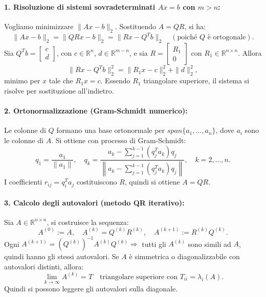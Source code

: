 \documentclass[12pt,a4paper]{article}
\begin{document}
\paragraph{1. Risoluzione di sistemi sovradeterminati \( Ax = b \) con \( m > n \):}

Vogliamo minimizzare \( \|Ax - b\|_2 \). Sostituendo \( A = QR \), si ha:
\[
\|Ax - b\|_2 = \|QRx - b\|_2 = \|Rx - Q^T b\|_2 \quad (\text{poiché } Q \text{ è ortogonale}).
\]
Sia \( Q^T b = \begin{bmatrix} c \\ d \end{bmatrix} \), con \( c \in \mathbb{R}^n \), \( d \in \mathbb{R}^{m-n} \), e sia \( R = \begin{bmatrix} R_1 \\ 0 \end{bmatrix} \) con \( R_1 \in \mathbb{R}^{n \times n} \). Allora
\[
\|Rx - Q^T b\|_2^2 = \|R_1 x - c\|_2^2 + \|d\|_2^2,
\]
minimo per \( x \) tale che \( R_1 x = c \). Essendo \( R_1 \) triangolare superiore, il sistema si risolve per sostituzione all'indietro.

\paragraph{2. Ortonormalizzazione (Gram-Schmidt numerico):}

Le colonne di \( Q \) formano una base ortonormale per \( span\{a_1, \dots, a_n\} \), dove \( a_i \) sono le colonne di \( A \). Si ottiene con processo di Gram-Schmidt:
\[
q_1 = \frac{a_1}{\|a_1\|},\quad
q_k = \frac{a_k - \sum_{j=1}^{k-1} (q_j^T a_k) q_j}{\left\| a_k - \sum_{j=1}^{k-1} (q_j^T a_k) q_j \right\|},\quad k = 2, \dots, n.
\]
I coefficienti \( r_{ij} = q_i^T a_j \) costituiscono \( R \), quindi si ottiene \( A = QR \).

\paragraph{3. Calcolo degli autovalori (metodo QR iterativo):}

Sia \( A \in \mathbb{R}^{n \times n} \), si costruisce la sequenza:
\[
A^{(0)} := A,\quad A^{(k)} = Q^{(k)} R^{(k)},\quad A^{(k+1)} := R^{(k)} Q^{(k)}.
\]
Ogni \( A^{(k+1)} = (Q^{(k)})^{-1} A^{(k)} Q^{(k)} \Rightarrow \) tutti gli \( A^{(k)} \) sono simili ad \( A \), quindi hanno gli stessi autovalori. Se \( A \) è simmetrica o diagonalizzabile con autovalori distinti, allora:
\[
\lim_{k \to \infty} A^{(k)} = T \quad \text{triangolare superiore con } T_{ii} = \lambda_i(A).
\]
Quindi si possono leggere gli autovalori sulla diagonale.
\end{document}
